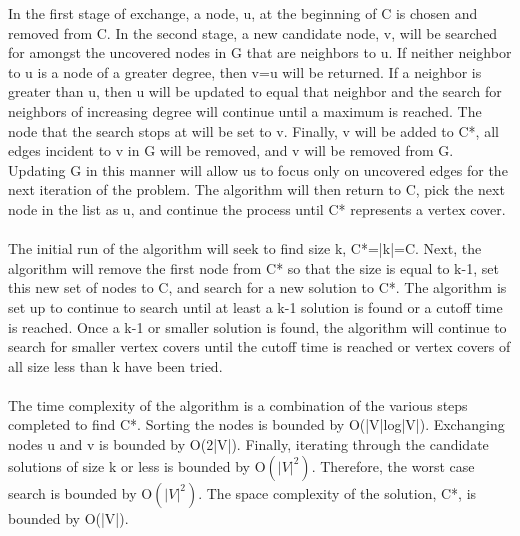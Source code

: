 \documentclass{sig-alternate-05-2015}
\begin{document}
In the first stage of exchange, a node, u, at the beginning of C is chosen and removed from C.  In the second stage, a new candidate node, v, will be searched for amongst the uncovered nodes in G that are neighbors to u.  If neither neighbor to u is a node of a greater degree, then v=u will be returned.  If a neighbor is greater than u, then u will be updated to equal that neighbor and the search for neighbors of increasing degree will continue until a maximum is reached. The node that the search stops at will be set to v. Finally, v will be added to C*, all edges incident to v in G will be removed, and v will be removed from G. Updating G in this manner will allow us to focus only on uncovered edges for the next iteration of the problem. The algorithm will then return to C, pick the next node in the list as u, and continue the process until C* represents a vertex cover.
\\
\\
The initial run of the algorithm will seek to find size k, C*=|k|=C.  Next, the algorithm will remove the first node from C* so that the size is equal to k-1, set this new set of nodes to C, and search for a new solution to C*.  The algorithm is set up to continue to search until at least a k-1 solution is found or a cutoff time is reached.  Once a k-1 or smaller solution is found, the algorithm will continue to search for smaller vertex covers until the cutoff time is reached or vertex covers of all size less than k have been tried.
\\
\\
	The time complexity of the algorithm is a combination of the various steps completed to find C*.  Sorting the nodes is bounded by O(|V|log|V|).  Exchanging nodes u and v is bounded by O(2|V|).  Finally, iterating through the candidate solutions of size k or less is bounded by O$(|V|^{2})$.  Therefore, the worst case search is bounded by O$(|V|^{2})$.  The space complexity of the solution, C*, is bounded by O(|V|).
\end{document}

